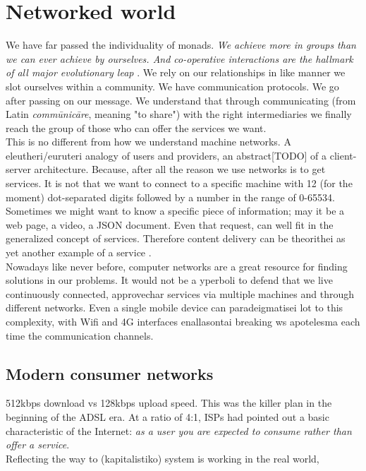 \documentclass[12pt,a4paper,oneside]{article}
\begin{document}
\newpage
\section{Networked world}
We have far passed the individuality of monads. \emph{We achieve more in groups than we can ever achieve by ourselves. And co-operative interactions are the hallmark of all major evolutionary leap} \cite{Christakis2011}. We rely on our relationships in like manner we slot ourselves within a community. We have communication protocols. We go after passing on our message. We understand that through communicating (from Latin \emph{comm\={u}nic\={a}re}, meaning "to share") with the right intermediaries we finally reach the group of those who can offer the services we want.\\
\indent This is no different from how we understand machine networks.
A eleutheri/euruteri analogy of users and providers, an abstract[TODO] of a client-server architecture.
Because, after all the reason we use networks is to get services.
It is not that we want to connect to a specific machine with 12 (for the moment) dot-separated digits followed by a number in the range of 0-65534.\\
\indent Sometimes we might want to know a specific piece of information; may it be a web page, a video, a JSON document.
Even that request, can well fit in the generalized concept of services.
Therefore content delivery can be theorithei as yet another example of a service \cite{Braun2011}.\\
\indent Nowadays like never before, computer networks are a great resource for finding solutions in our problems.
It would not be a yperboli to defend that we live continuously connected, approvechar services via multiple machines and through different networks.
Even a single mobile device can paradeigmatisei lot to this complexity, with Wifi and 4G interfaces enallasontai breaking ws apotelesma each time the communication channels.\\

\subsection{Modern consumer networks}
512kbps download vs 128kbps upload speed.
This was the killer plan in the beginning of the ADSL era.
At a ratio of 4:1, ISPs  had pointed out a basic characteristic of the Internet: \emph{as a user you are expected to consume rather than offer a service}.\\
\indent Reflecting the way to (kapitalistiko) system is working in the real world, 
\end{document}
